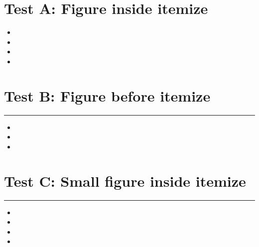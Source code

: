 \documentclass[a4paper,11pt]{article}
\begin{document}
\section*{Test A: Figure inside itemize}
\begin{itemize}
  \item \swarmwrapnext\lipsum[17][1-4]
  \item \lipsum[19][1-3]
  \item \lipsum[20][1-3]
  \item \lipsum[21][1-3]
\end{itemize}

\newpage

\section*{Test B: Figure before itemize}
\begin{swarmwrap}%
  \begin{minipage}[t]{3cm}
    \centering
    \rule{\linewidth}{4cm}
  \end{minipage}%
\end{swarmwrap}%
\swarmwrapnext
\lipsum[1]
\begin{itemize}
  \item \lipsum[2][1-3]
  \item \lipsum[3][1-3]
  \item \lipsum[4][1-3]
\end{itemize}

\newpage

\section*{Test C: Small figure inside itemize}
\begin{swarmwrap}%
  \begin{minipage}[t]{2cm}
    \centering
    \rule{\linewidth}{3cm}
  \end{minipage}%
\end{swarmwrap}%
\begin{itemize}
  \item \swarmwrapnext\lipsum[141][1-4]
  \item \lipsum[143][1-3]
  \item \lipsum[144][1-3]
  \item \lipsum[145][1-3]
\end{itemize}
\end{document}

